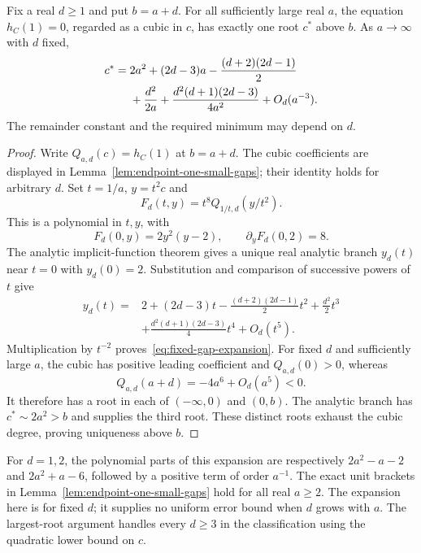 \begin{proposition}
\label{prop:fixed-gap-expansion}
Fix a real $d\geq1$ and put $b=a+d$. For all sufficiently large real
$a$, the equation $h_C(1)=0$, regarded as a cubic in $c$, has exactly
one root $c^*$ above $b$. As $a\to\infty$ with $d$ fixed,
\begin{align}
 c^*={}&2a^2+(2d-3)a-\frac{(d+2)(2d-1)}2
 \notag\\
 &+\frac{d^2}{2a}
 +\frac{d^2(d+1)(2d-3)}{4a^2}+O_d(a^{-3}).
 \label{eq:fixed-gap-expansion}
\end{align}
The remainder constant and the required minimum may depend on $d$.
\end{proposition}
\begin{proof}
Write $Q_{a,d}(c)=h_C(1)$ at $b=a+d$. The cubic coefficients are
displayed in Lemma~\ref{lem:endpoint-one-small-gaps}; their identity
holds for arbitrary $d$. Set $t=1/a$, $y=t^2c$ and
\[
 F_d(t,y)=t^8Q_{1/t,d}(y/t^2).
\]
This is a polynomial in $t,y$, with
\[
 F_d(0,y)=2y^2(y-2),\qquad
 \partial_yF_d(0,2)=8.
\]
The analytic implicit-function theorem gives a unique real analytic
branch $y_d(t)$ near $t=0$ with $y_d(0)=2$. Substitution and comparison
of successive powers of $t$ give
\begin{align*}
 y_d(t)={}&2+(2d-3)t-\frac{(d+2)(2d-1)}2t^2
 +\frac{d^2}{2}t^3\\
 &+\frac{d^2(d+1)(2d-3)}4t^4+O_d(t^5).
\end{align*}
Multiplication by $t^{-2}$ proves~\eqref{eq:fixed-gap-expansion}.
For fixed $d$ and sufficiently large $a$, the cubic has positive
leading coefficient and $Q_{a,d}(0)>0$, whereas
\[
 Q_{a,d}(a+d)=-4a^6+O_d(a^5)<0.
\]
It therefore has a root in each of $(-\infty,0)$ and $(0,b)$.
The analytic branch has $c^*\sim2a^2>b$ and supplies the third root.
These distinct roots exhaust the cubic degree, proving uniqueness
above $b$.
\end{proof}

For $d=1,2$, the polynomial parts of this expansion are respectively
$2a^2-a-2$ and $2a^2+a-6$, followed by a positive term of order
$a^{-1}$. The exact unit brackets in
Lemma~\ref{lem:endpoint-one-small-gaps} hold for all real $a\geq2$.
The expansion here is for fixed $d$; it supplies no uniform error bound
when $d$ grows with $a$. The largest-root argument handles every
$d\geq3$ in the classification using the quadratic lower bound on $c$.
